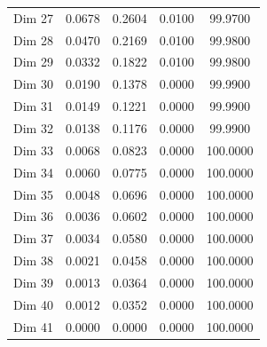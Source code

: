 \begin{table}[H]
\begin{tabular}{|c|c|c|c|c|}
Dim 27 & 0.0678 & 0.2604 & 0.0100 & 99.9700 \\
Dim 28 & 0.0470 & 0.2169 & 0.0100 & 99.9800 \\
Dim 29 & 0.0332 & 0.1822 & 0.0100 & 99.9800 \\
Dim 30 & 0.0190 & 0.1378 & 0.0000 & 99.9900 \\
Dim 31 & 0.0149 & 0.1221 & 0.0000 & 99.9900 \\
Dim 32 & 0.0138 & 0.1176 & 0.0000 & 99.9900 \\
Dim 33 & 0.0068 & 0.0823 & 0.0000 & 100.0000 \\
Dim 34 & 0.0060 & 0.0775 & 0.0000 & 100.0000 \\
Dim 35 & 0.0048 & 0.0696 & 0.0000 & 100.0000 \\
Dim 36 & 0.0036 & 0.0602 & 0.0000 & 100.0000 \\
Dim 37 & 0.0034 & 0.0580 & 0.0000 & 100.0000 \\
Dim 38 & 0.0021 & 0.0458 & 0.0000 & 100.0000 \\
Dim 39 & 0.0013 & 0.0364 & 0.0000 & 100.0000 \\
Dim 40 & 0.0012 & 0.0352 & 0.0000 & 100.0000 \\
Dim 41 & 0.0000 & 0.0000 & 0.0000 & 100.0000 \\
\hline
\end{tabular}
\end{table}